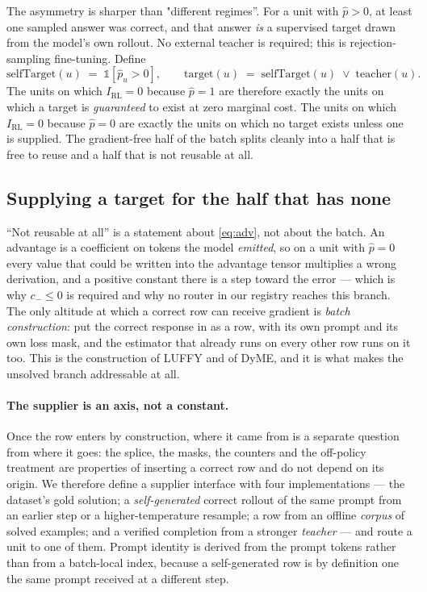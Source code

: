 The asymmetry is sharper than "different regimes''. For a unit with $\hat p > 0$, at least
one sampled answer was correct, and that answer \emph{is} a supervised target drawn from
the model's own rollout. No external teacher is required; this is rejection-sampling
fine-tuning. Define
%
\begin{equation}
  \mathrm{selfTarget}(u) \;=\; \mathbb{1}\!\left[\hat p_u > 0\right],
  \qquad
  \mathrm{target}(u) \;=\; \mathrm{selfTarget}(u) \;\vee\; \mathrm{teacher}(u).
  \label{eq:target}
\end{equation}
%
The units on which $I_{\mathrm{RL}}=0$ because $\hat p = 1$ are therefore exactly the units
on which a target is \emph{guaranteed} to exist at zero marginal cost. The units on which
$I_{\mathrm{RL}}=0$ because $\hat p = 0$ are exactly the units on which no target exists
unless one is supplied. The gradient-free half of the batch splits cleanly into a half that
is free to reuse and a half that is not reusable at all.

\subsection{Supplying a target for the half that has none}
\label{sec:supply}

``Not reusable at all'' is a statement about \eqref{eq:adv}, not about the batch. An advantage
is a coefficient on tokens the model \emph{emitted}, so on a unit with $\hat p = 0$ every value
that could be written into the advantage tensor multiplies a wrong derivation, and a positive
constant there is a step toward the error --- which is why $c_- \le 0$ is required and why no
router in our registry reaches this branch. The only altitude at which a correct row can receive
gradient is \emph{batch construction}: put the correct response in as a row, with its own prompt
and its own loss mask, and the estimator that already runs on every other row runs on it too.
This is the construction of LUFFY and of DyME, and it is what makes the unsolved branch
addressable at all.

\paragraph{The supplier is an axis, not a constant.} Once the row enters by construction, where
it came from is a separate question from where it goes: the splice, the masks, the counters and
the off-policy treatment are properties of inserting a correct row and do not depend on its
origin. We therefore define a supplier interface with four implementations --- the dataset's
gold solution; a \emph{self-generated} correct rollout of the same prompt from an earlier step
or a higher-temperature resample; a row from an offline \emph{corpus} of solved examples; and a
verified completion from a stronger \emph{teacher} --- and route a unit to one of them. Prompt
identity is derived from the prompt tokens rather than from a batch-local index, because a
self-generated row is by definition one the same prompt received at a different step.

